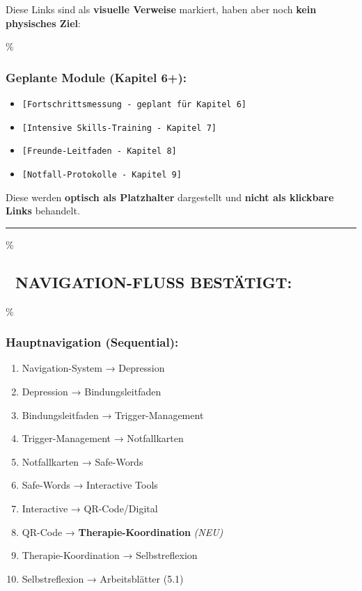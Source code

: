 Diese Links sind als \textbf{visuelle Verweise} markiert, haben aber noch \textbf{kein physisches Ziel}:

\hypertarget{geplante-module-kapitel-6}{\%
\subsubsection{\texorpdfstring{\textbf{Geplante Module (Kapitel 6+):}}{Geplante Module (Kapitel 6+):}}\label{geplante-module-kapitel-6}}

\begin{itemize}
\tightlist
\item
  \texttt{{[}Fortschrittsmessung\ -\ geplant\ für\ Kapitel\ 6{]}}
\item
  \texttt{{[}Intensive\ Skills-Training\ -\ Kapitel\ 7{]}}
\item
  \texttt{{[}Freunde-Leitfaden\ -\ Kapitel\ 8{]}}
\item
  \texttt{{[}Notfall-Protokolle\ -\ Kapitel\ 9{]}}
\end{itemize}

Diese werden \textbf{optisch als Platzhalter} dargestellt und \textbf{nicht als klickbare Links} behandelt.

\begin{center}\rule{0.5\linewidth}{0.5pt}\end{center}

\hypertarget{navigation-fluss-bestuxe4tigt}{\%
\subsection{\texorpdfstring{🎯 \textbf{NAVIGATION-FLUSS BESTÄTIGT:}}{🎯 NAVIGATION-FLUSS BESTÄTIGT:}}\label{navigation-fluss-bestuxe4tigt}}

\hypertarget{hauptnavigation-sequential}{\%
\subsubsection{\texorpdfstring{\textbf{Hauptnavigation (Sequential):}}{Hauptnavigation (Sequential):}}\label{hauptnavigation-sequential}}

\begin{enumerate}
\def\labelenumi{\arabic{enumi}.}
\tightlist
\item
  Navigation-System → Depression
\item
  Depression → Bindungsleitfaden
\item
  Bindungsleitfaden → Trigger-Management\\
\item
  Trigger-Management → Notfallkarten
\item
  Notfallkarten → Safe-Words
\item
  Safe-Words → Interactive Tools
\item
  Interactive → QR-Code/Digital
\item
  QR-Code → \textbf{Therapie-Koordination} \emph{(NEU)}
\item
  Therapie-Koordination → Selbstreflexion
\item
  Selbstreflexion → Arbeitsblätter (5.1)
\end{enumerate}

